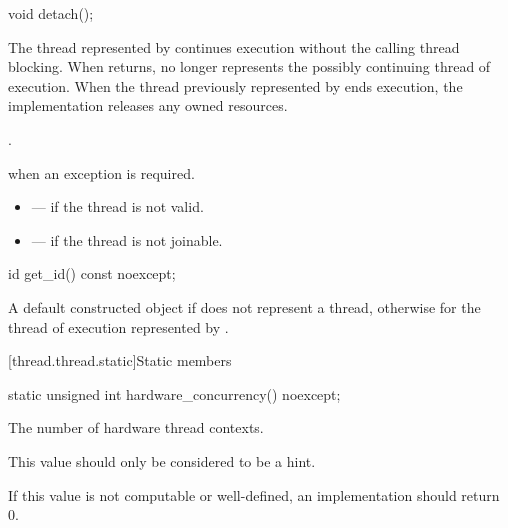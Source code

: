 %
\begin{itemdecl}
void detach();
\end{itemdecl}

\begin{itemdescr}
\pnum
\effects
The thread represented by  continues execution without the calling thread
blocking. When  returns,  no longer represents the possibly continuing
thread of execution. When the thread previously represented by  ends execution, the
implementation releases any owned resources.

\pnum
\ensures
{}.

\pnum
\throws
{} when
an exception is required.

\pnum
\errors
\begin{itemize}
\item {} --- if the thread is not valid.
\item {} --- if the thread is not joinable.
\end{itemize}
\end{itemdescr}

%
\begin{itemdecl}
id get_id() const noexcept;
\end{itemdecl}

\begin{itemdescr}
\pnum
\returns
A default constructed  object if  does not represent a thread,
otherwise  for the thread of execution represented by
.
\end{itemdescr}

[thread.thread.static]{Static members}

%
\begin{itemdecl}
static unsigned int hardware_concurrency() noexcept;
\end{itemdecl}

\begin{itemdescr}
\pnum
\returns
The number of hardware thread contexts.
\begin{note}
This value should
only be considered to be a hint.
\end{note}
If this value is not computable or
well-defined, an implementation should return 0.
\end{itemdescr}

